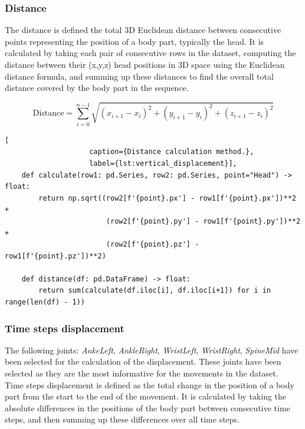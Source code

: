             \subsubsection{Distance}

                The distance is defined the total 3D Euclidean distance between consecutive points representing the position of a body part, typically the head. It is calculated by taking each pair of consecutive rows in the dataset, computing the distance between their (x,y,z) head positions in 3D space using the Euclidean distance formula, and summing  up these distances to find the overall total distance covered by the body part in the sequence.

                \begin{equation}
                    \text{Distance} = \sum_{i=0}^{n-1} \sqrt{(x_{i+1} - x_i)^2 + (y_{i+1} - y_i)^2 + (z_{i+1} - z_i)^2}
                \end{equation}

                \begin{lstlisting}[
                    caption={Distance calculation method.}, 
                    label={lst:vertical_displacement}],     
    def calculate(row1: pd.Series, row2: pd.Series, point="Head") -> float:
        return np.sqrt((row2[f'{point}.px'] - row1[f'{point}.px'])**2 +
                        (row2[f'{point}.py'] - row1[f'{point}.py'])**2 +
                        (row2[f'{point}.pz'] - row1[f'{point}.pz'])**2)
    
    def distance(df: pd.DataFrame) -> float:
        return sum(calculate(df.iloc[i], df.iloc[i+1]) for i in range(len(df) - 1))
                \end{lstlisting}
            \subsubsection{Time steps displacement}
                The following joints: \textit{AnkeLeft}, \textit{AnkleRight}, \textit{WristLeft}, \textit{WristRight}, \textit{SpineMid} have been selected for the calculation of the displacement. These joints have been selected as they are the most informative for the movements in the dataset. \\

                Time steps displacement is defined as the total change in the position of a body part from the start to the end of the movement. It is calculated by taking the absolute differences in the positions of the body part between consecutive time steps, and then summing up these differences over all time steps.

